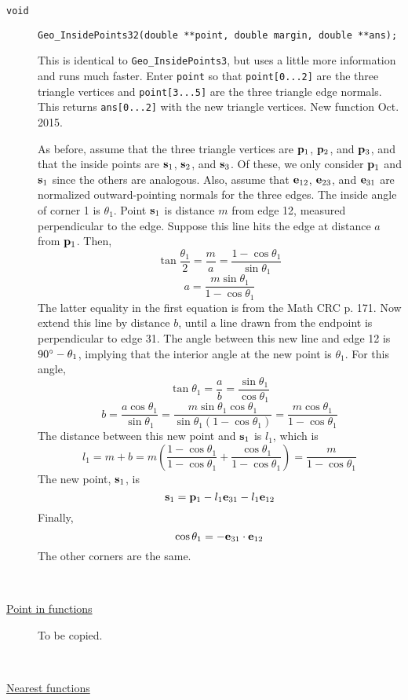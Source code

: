 \documentclass[11pt]{article}
\newcommand {\ttt} {\texttt}
\begin{document}
\begin{description}
\item[\ttt{void}]
\ttt{Geo\_InsidePoints32(double **point, double margin, double **ans);}

This is identical to \ttt{Geo\_InsidePoints3}, but uses a little more information and runs much faster. Enter \ttt{point} so that \ttt{point[0...2]} are the three triangle vertices and \ttt{point[3...5]} are the three triangle edge normals. This returns \ttt{ans[0...2]} with the new triangle vertices. New function Oct. 2015.

As before, assume that the three triangle vertices are $\vb{p}_1$, $\vb{p}_2$, and $\vb{p}_3$, and that the inside points are $\vb{s}_1$, $\vb{s}_2$, and $\vb{s}_3$. Of these, we only consider $\vb{p}_1$ and $\vb{s}_1$ since the others are analogous. Also, assume that $\vb{e}_{12}$, $\vb{e}_{23}$, and $\vb{e}_{31}$ are normalized outward-pointing normals for the three edges. The inside angle of corner 1 is $\theta_1$. Point $\vb{s}_1$ is distance $m$ from edge 12, measured perpendicular to the edge. Suppose this line hits the edge at distance $a$ from $\vb{p}_1$. Then,
$$\tan \frac{\theta_1}{2} = \frac{m}{a} = \frac{1-\cos \theta_1}{\sin \theta_1}$$
$$a=\frac{m \sin \theta_1}{1-\cos \theta_1}$$
The latter equality in the first equation is from the Math CRC p. 171. Now extend this line by distance $b$, until a line drawn from the endpoint is perpendicular to edge 31. The angle between this new line and edge 12 is $90\degree-\theta_1$, implying that the interior angle at the new point is $\theta_1$. For this angle,
$$\tan \theta_1 = \frac{a}{b} = \frac{\sin \theta_1}{\cos \theta_1}$$
$$b = \frac{a \cos \theta_1}{\sin \theta_1} = \frac{m \sin \theta_1 \cos \theta_1}{\sin \theta_1(1-\cos \theta_1)} = \frac{m \cos \theta_1}{1-\cos \theta_1}$$
The distance between this new point and $\vb{s}_1$ is $l_1$, which is
$$l_1 = m+b = m\left(\frac{1- \cos \theta_1}{1-\cos \theta_1}+\frac{\cos \theta_1}{1-\cos \theta_1} \right) = \frac{m}{1-\cos \theta_1}$$
The new point, $\vb{s}_1$, is
$$\vb{s}_1 = \vb{p}_1 - l_1\vb{e}_{31} - l_1\vb{e}_{12}$$
Finally,
$$\cos \theta_1 = - \vb{e}_{31} \cdot \vb{e}_{12}$$
The other corners are the same.

\hfill \\
\item[\underline{Point in functions}]

To be copied.

\hfill \\
\item[\underline{Nearest functions}]


\end{description}
\end{document}
